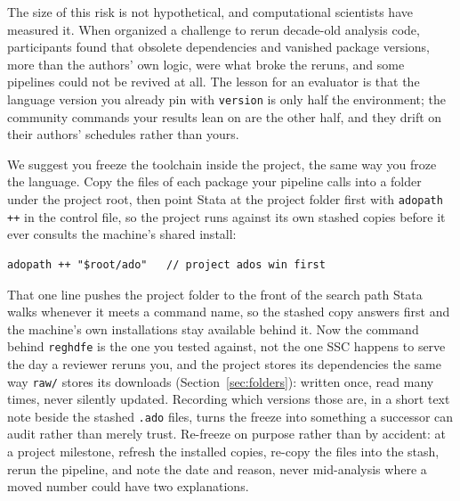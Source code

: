 \documentclass[
    a4paper,
    fontsize=10pt,
    twoside=true,
    numbers=noenddot,
]{kaobook}
\begin{document}
The size of this risk is not hypothetical, and computational scientists have measured it. When \textcite{perkel2020code} organized a challenge to rerun decade-old analysis code, participants found that obsolete dependencies and vanished package versions, more than the authors' own logic, were what broke the reruns, and some pipelines could not be revived at all. The lesson for an evaluator is that the language version you already pin with \texttt{version} is only half the environment; the community commands your results lean on are the other half, and they drift on their authors' schedules rather than yours.

We suggest you freeze the toolchain inside the project, the same way you froze the language. Copy the files of each package your pipeline calls into a folder under the project root, then point Stata at the project folder first with \texttt{adopath ++} in the control file, so the project runs against its own stashed copies before it ever consults the machine's shared install:
\par
{\footnotesize
\begin{verbatim}
adopath ++ "$root/ado"   // project ados win first
\end{verbatim}
}
That one line pushes the project folder to the front of the search path Stata walks whenever it meets a command name, so the stashed copy answers first and the machine's own installations stay available behind it. Now the command behind \texttt{reghdfe} is the one you tested against, not the one SSC happens to serve the day a reviewer reruns you, and the project stores its dependencies the same way \texttt{raw/} stores its downloads (Section~\ref{sec:folders}): written once, read many times, never silently updated. Recording which versions those are, in a short text note beside the stashed \texttt{.ado} files, turns the freeze into something a successor can audit rather than merely trust. Re-freeze on purpose rather than by accident: at a project milestone, refresh the installed copies, re-copy the files into the stash, rerun the pipeline, and note the date and reason, never mid-analysis where a moved number could have two explanations.
\end{document}
